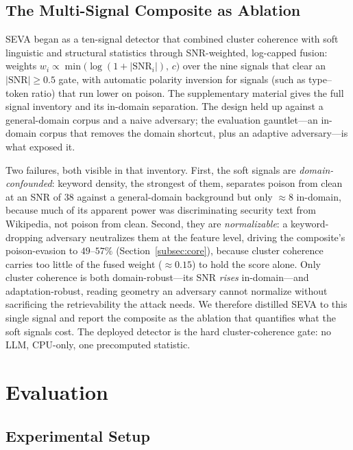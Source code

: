 \documentclass[10pt,journal,compsoc]{IEEEtran}
\begin{document}
\subsection{The Multi-Signal Composite as Ablation}
SEVA began as a ten-signal detector that combined cluster coherence with soft
linguistic and structural statistics through SNR-weighted, log-capped fusion:
weights $w_i \propto \min\!\big(\log(1+|\mathrm{SNR}_i|),\,c\big)$ over the nine
signals that clear an $|\mathrm{SNR}|\geq0.5$ gate, with automatic polarity
inversion for signals (such as type--token ratio) that run lower on poison.
The supplementary material gives the full signal inventory and its in-domain separation. The
design held up against a general-domain corpus and a naive adversary; the
evaluation gauntlet---an in-domain corpus that removes the domain shortcut, plus an
adaptive adversary---is what exposed it.

Two failures, both visible in that inventory. First, the soft signals are
\emph{domain-confounded}: keyword density, the strongest of them, separates poison
from clean at an SNR of $38$ against a general-domain background but only
$\approx\!8$ in-domain, because much of its apparent power was discriminating
security text from Wikipedia, not poison from clean.
Second, they are \emph{normalizable}: a keyword-dropping adversary neutralizes them
at the feature level, driving the composite's poison-evasion to $49$--$57\%$
(Section~\ref{subsec:core}), because cluster coherence carries too little of the
fused weight ($\approx\!0.15$) to hold the score alone.
Only cluster coherence is both domain-robust---its SNR \emph{rises} in-domain---and
adaptation-robust, reading geometry an adversary cannot normalize without
sacrificing the retrievability the attack needs. We therefore distilled SEVA to
this single signal and report the composite as the ablation that quantifies what
the soft signals cost. The deployed detector is the hard cluster-coherence gate: no
LLM, CPU-only, one precomputed statistic.

\section{Evaluation}
\label{sec:eval}
\subsection{Experimental Setup}
\end{document}
